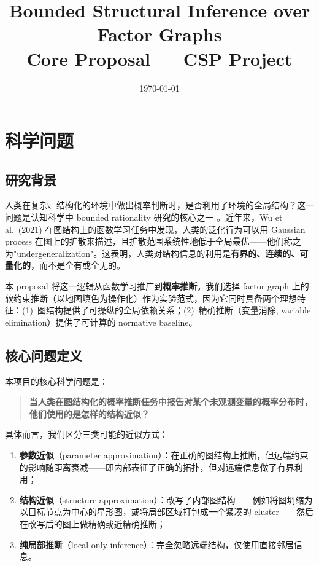 \documentclass[11pt,a4paper]{ctexart}
\title{\textbf{Bounded Structural Inference over Factor Graphs}\\[4pt]
\large Core Proposal — CSP Project}
\author{}
\date{\today}
\begin{document}
\maketitle
\tableofcontents
\bigskip

\section{科学问题}
\label{sec:question}

\subsection{研究背景}

人类在复杂、结构化的环境中做出概率判断时，是否利用了环境的全局结构？这一问题是认知科学中 bounded rationality 研究的核心之一 \cite{Gigerenzer1995,Todd2007}。近年来，Wu et al.\ (2021) \cite{Wu2021} 在图结构上的函数学习任务中发现，人类的泛化行为可以用 Gaussian process 在图上的扩散来描述，且扩散范围系统性地低于全局最优——他们称之为"undergeneralization"。这表明，人类对结构信息的利用是\textbf{有界的、连续的、可量化的}，而不是全有或全无的。

本 proposal 将这一逻辑从函数学习推广到\textbf{概率推断}。我们选择 factor graph 上的软约束推断（以地图填色为操作化）作为实验范式，因为它同时具备两个理想特征：(1)~图结构提供了可操纵的全局依赖关系；(2)~精确推断（变量消除, variable elimination）提供了可计算的 normative baseline。

\subsection{核心问题定义}

本项目的核心科学问题是：

\begin{quote}
\textbf{当人类在图结构化的概率推断任务中报告对某个未观测变量的概率分布时，他们使用的是怎样的结构近似？}
\end{quote}

具体而言，我们区分三类可能的近似方式：
\begin{enumerate}[label=(\alph*)]
    \item \textbf{参数近似}（parameter approximation）：在正确的图结构上推断，但远端约束的影响随距离衰减——即内部表征了正确的拓扑，但对远端信息做了有界利用；
    \item \textbf{结构近似}（structure approximation）：改写了内部图结构——例如将图坍缩为以目标节点为中心的星形图，或将局部区域打包成一个紧凑的 cluster——然后在改写后的图上做精确或近精确推断；
    \item \textbf{纯局部推断}（local-only inference）：完全忽略远端结构，仅使用直接邻居信息。
\end{enumerate}
\end{document}
